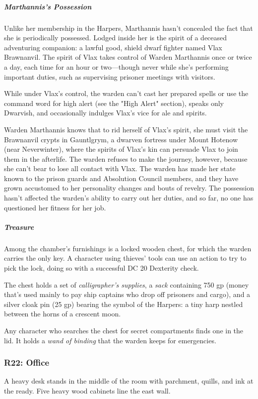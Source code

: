 \documentclass[10pt,a4paper,twoside,bg=print,twocolumn,openany,nodeprecatedcode]{dndbook}
\begin{document}
\subparagraph{Marthannis's Possession}
Unlike her membership in the Harpers, Marthannis hasn't concealed the fact that she is periodically possessed. Lodged inside her is the spirit of a deceased adventuring companion: a lawful good, shield dwarf fighter named Vlax Brawnanvil. The spirit of Vlax takes control of Warden Marthannis once or twice a day, each time for an hour or two—though never while she's performing important duties, such as supervising prisoner meetings with visitors.

While under Vlax's control, the warden can't cast her prepared spells or use the command word for high alert (see the "High Alert" section), speaks only Dwarvish, and occasionally indulges Vlax's vice for ale and spirits.

Warden Marthannis knows that to rid herself of Vlax's spirit, she must visit the Brawnanvil crypts in Gauntlgrym, a dwarven fortress under Mount Hotenow (near Neverwinter), where the spirits of Vlax's kin can persuade Vlax to join them in the afterlife. The warden refuses to make the journey, however, because she can't bear to lose all contact with Vlax. The warden has made her state known to the prison guards and Absolution Council members, and they have grown accustomed to her personality changes and bouts of revelry. The possession hasn't affected the warden's ability to carry out her duties, and so far, no one has questioned her fitness for her job.

\subparagraph{Treasure}
Among the chamber's furnishings is a locked wooden chest, for which the warden carries the only key. A character using thieves' tools can use an action to try to pick the lock, doing so with a successful DC 20 Dexterity check.

The chest holds a set of \textit{calligrapher's supplies}, a \textit{sack} containing 750 gp (money that's used mainly to pay ship captains who drop off prisoners and cargo), and a silver cloak pin (25 gp) bearing the symbol of the Harpers: a tiny harp nestled between the horns of a crescent moon.

Any character who searches the chest for secret compartments finds one in the lid. It holds a \textit{wand of binding} that the warden keeps for emergencies.

\subsubsection{R22: Office}
\begin{DndReadAloud}{}
A heavy desk stands in the middle of the room with parchment, quills, and ink at the ready. Five heavy wood cabinets line the east wall.

\end{DndReadAloud}
\end{document}
